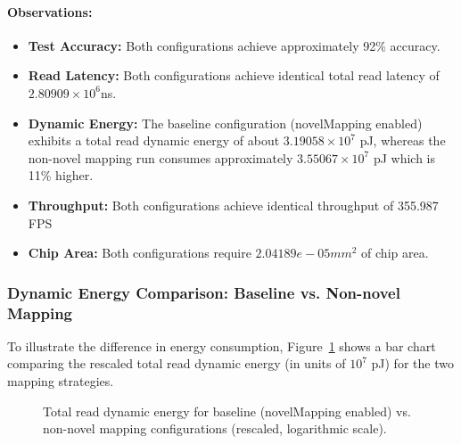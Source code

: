 \documentclass[11pt]{article}
\begin{document}
\paragraph{Observations:}
\begin{itemize}
    \item \textbf{Test Accuracy:} Both configurations achieve approximately 92\% accuracy.
     \item \textbf{Read Latency:} Both configurations achieve identical total read latency of $2.80909\times10^6$ns. 
    \item \textbf{Dynamic Energy:} The baseline configuration (novelMapping enabled) exhibits a total read dynamic energy of about $3.19058\times10^7$ pJ, whereas the non-novel mapping run consumes approximately $3.55067\times10^7$ pJ which is 11\% higher.
    \item \textbf{Throughput:} Both configurations achieve identical throughput of 355.987 FPS
    \item \textbf{Chip Area:} Both configurations require $2.04189e-05 {mm}^2$ of chip area.
\end{itemize}

\subsubsection{Dynamic Energy Comparison: Baseline vs. Non-novel Mapping}
To illustrate the difference in energy consumption, Figure~\ref{fig:novel_mapping_energy_bar} shows a bar chart comparing the rescaled total read dynamic energy (in units of $10^7$ pJ) for the two mapping strategies.

\begin{figure}[H]
    \centering
    \caption{Total read dynamic energy for baseline (novelMapping enabled) vs. non-novel mapping configurations (rescaled, logarithmic scale).}
    \label{fig:novel_mapping_energy_bar}
\end{figure}
\end{document}
